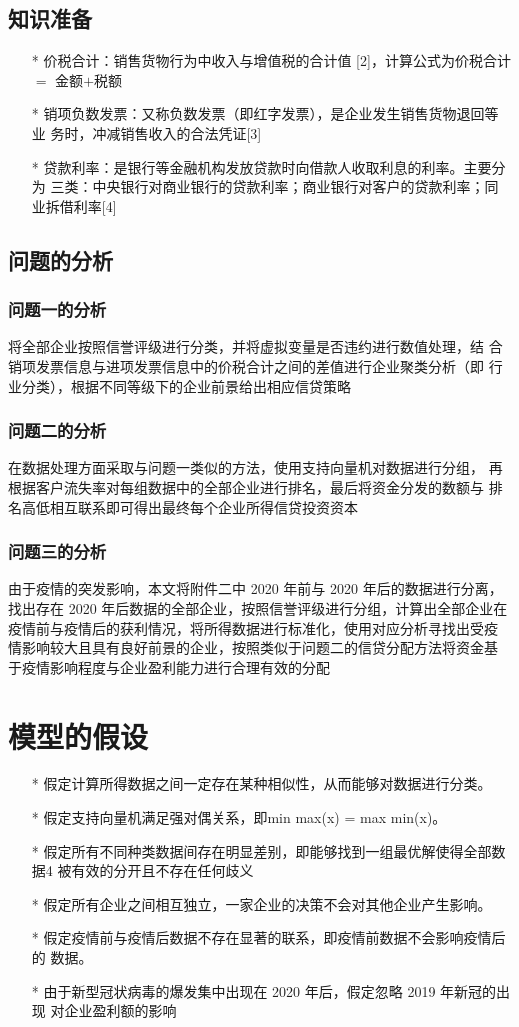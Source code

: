 \documentclass{article}
\begin{document}
\subsection{知识准备}
    \begin{itemize} 
        \item [*] 价税合计：销售货物行为中收入与增值税的合计值
        [2]，计算公式为价税合计 $=$ 金额$+$税额
        \item [*] 销项负数发票：又称负数发票（即红字发票），是企业发生销售货物退回等业
        务时，冲减销售收入的合法凭证[3]
        \item [*] 贷款利率：是银行等金融机构发放贷款时向借款人收取利息的利率。主要分为
        三类：中央银行对商业银行的贷款利率；商业银行对客户的贷款利率；同业拆借利率[4]
    \end{itemize}
\subsection{问题的分析}
\subsubsection{问题一的分析}
将全部企业按照信誉评级进行分类，并将虚拟变量是否违约进行数值处理，结
合销项发票信息与进项发票信息中的价税合计之间的差值进行企业聚类分析（即
行业分类），根据不同等级下的企业前景给出相应信贷策略
\subsubsection{问题二的分析}
在数据处理方面采取与问题一类似的方法，使用支持向量机对数据进行分组，
再根据客户流失率对每组数据中的全部企业进行排名，最后将资金分发的数额与
排名高低相互联系即可得出最终每个企业所得信贷投资资本
\subsubsection{问题三的分析}
由于疫情的突发影响，本文将附件二中 2020 年前与 2020 年后的数据进行分离，
找出存在 2020 年后数据的全部企业，按照信誉评级进行分组，计算出全部企业在
疫情前与疫情后的获利情况，将所得数据进行标准化，使用对应分析寻找出受疫
情影响较大且具有良好前景的企业，按照类似于问题二的信贷分配方法将资金基
于疫情影响程度与企业盈利能力进行合理有效的分配
\section{模型的假设}
\begin{itemize}
    \item [*] 假定计算所得数据之间一定存在某种相似性，从而能够对数据进行分类。
    \item [*] 假定支持向量机满足强对偶关系，即min max(x) = max min(x)。
    \item [*] 假定所有不同种类数据间存在明显差别，即能够找到一组最优解使得全部数据4
    被有效的分开且不存在任何歧义
    \item [*] 假定所有企业之间相互独立，一家企业的决策不会对其他企业产生影响。
    \item [*] 假定疫情前与疫情后数据不存在显著的联系，即疫情前数据不会影响疫情后的
    数据。
    \item [*] 由于新型冠状病毒的爆发集中出现在 2020 年后，假定忽略 2019 年新冠的出现
    对企业盈利额的影响
\end{itemize}
\end{document}
